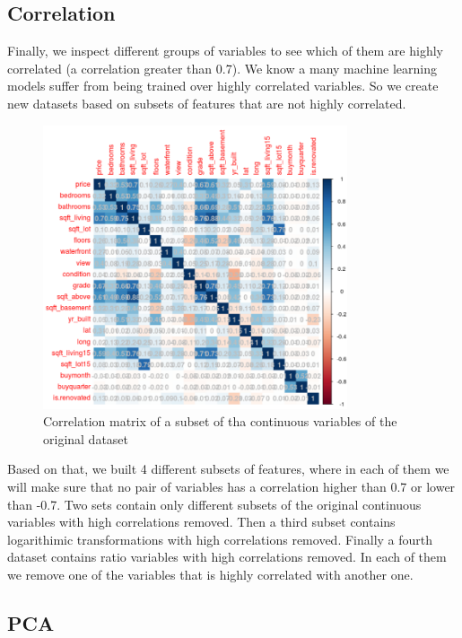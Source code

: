 \subsection{Correlation}

Finally, we inspect different groups of variables to see which of them are highly correlated (a correlation greater than 0.7). We know a many machine learning models suffer from being trained over highly correlated variables. So we create new datasets based on subsets of features that are not highly correlated.

\begin{figure}[H]
    \centering
        \includegraphics[width=0.8\textwidth]{img/corr01.png}
    \caption{Correlation matrix of a subset of tha continuous variables of the original dataset }\label{fig:rf_sfs}
\end{figure}

Based on that, we built 4 different subsets of features, where in each of them we will make sure that no pair of variables has a correlation higher than 0.7 or lower than -0.7. Two sets contain only different subsets of the original continuous variables with high correlations removed. Then a third subset contains logarithimic transformations with high correlations removed. Finally a fourth dataset contains ratio variables with high correlations removed. In each of them we remove one of the variables that is highly correlated with another one.



\subsection{PCA}

